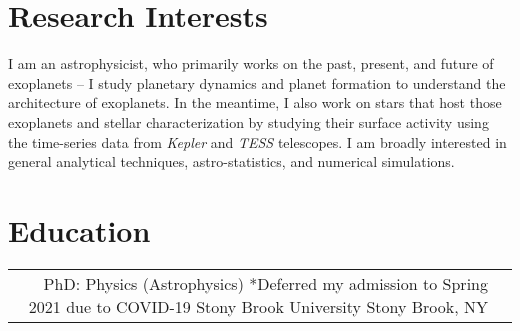 \documentclass[10pt]{article} %
\begin{document}
\begin{paracol}{1}


\section{Research Interests}
I am an astrophysicist, who primarily works on the past, present, and future of exoplanets -- I study planetary dynamics and planet formation to understand the architecture of exoplanets. 
In the meantime, I also work on stars that host those exoplanets and stellar characterization by studying
their surface activity using the time-series data from \textit{Kepler} and \textit{TESS} telescopes. 
I am broadly interested in general analytical techniques, astro-statistics, and numerical simulations. 


\section{Education} 





\begin{supertabular}{rl} %

	
	
	
	{PhD:} %
	{Physics (Astrophysics)} %
	{*Deferred my admission to Spring 2021 due to COVID-19} %
	{Stony Brook University} %
	{Stony Brook, NY}


\end{supertabular}
\end{paracol}
\end{document}
